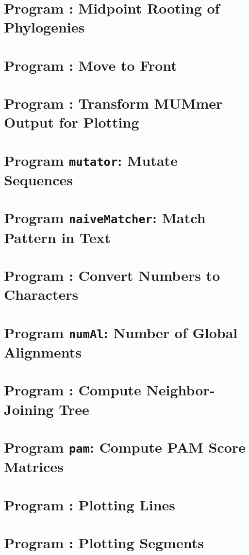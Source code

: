 \documentclass[a4paper]{report}
\begin{document}
\chapter{Program : Midpoint Rooting of
  Phylogenies}\label{ch:mr}

\chapter{Program : Move to Front}\label{ch:mt}

\chapter{Program : Transform MUMmer Output for
  Plotting}\label{ch:m2p}

\chapter{Program \texttt{mutator}: Mutate Sequences}\label{ch:mut}

\chapter{Program \texttt{naiveMatcher}: Match Pattern in
  Text}\label{ch:nm}

\chapter{Program : Convert Numbers to Characters}\label{ch:n2c}

\chapter{Program \texttt{numAl}: Number of Global
  Alignments}\label{ch:num}

\chapter{Program : Compute Neighbor-Joining Tree}\label{ch:nj}

\chapter{Program \texttt{pam}: Compute PAM Score
  Matrices}\label{ch:pam}

\chapter{Program : Plotting Lines}\label{ch:pl}

\chapter{Program : Plotting Segments}\label{ch:ps}

\end{document}
